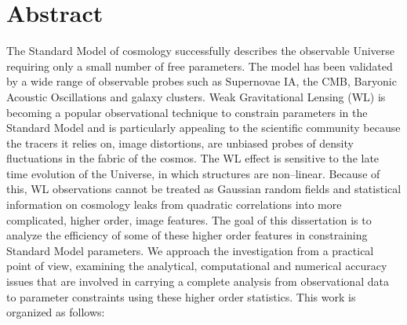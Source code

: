 \chapter*{Abstract} 

The Standard Model of cosmology successfully describes the observable Universe requiring only a small number of free parameters. The model has been validated by a wide range of observable probes such as Supernovae IA, the CMB, Baryonic Acoustic Oscillations and galaxy clusters. Weak Gravitational Lensing (WL) is becoming a popular observational technique to constrain parameters in the Standard Model and is particularly appealing to the scientific community because the tracers it relies on, image distortions, are unbiased probes of density fluctuations in the fabric of the cosmos. The WL effect is sensitive to the late time evolution of the Universe, in which structures are non--linear. Because of this, WL observations cannot be treated as Gaussian random fields and statistical information on cosmology leaks from quadratic correlations into more complicated, higher order, image features. The goal of this dissertation is to analyze the efficiency of some of these higher order features in constraining Standard Model parameters. We approach the investigation from a practical point of view, examining the analytical, computational and numerical accuracy issues that are involved in carrying a complete analysis from observational data to parameter constraints using these higher order statistics. This work is organized as follows:

